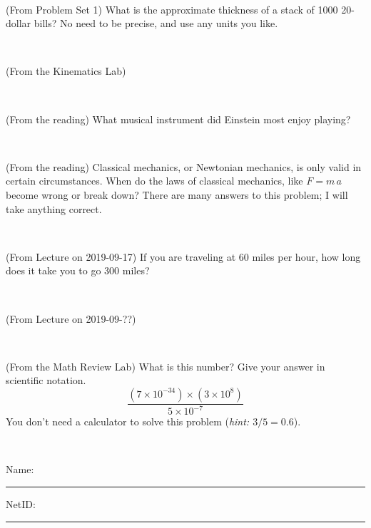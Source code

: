 \documentclass[12pt, letterpaper]{article}
\begin{document}
\vfill ~

\begin{problem} (From Problem Set 1)
What is the approximate thickness of a stack of 1000 20-dollar bills?
No need to be precise, and use any units you like.
\end{problem}


\vfill ~

\begin{problem} (From the Kinematics Lab)

\end{problem}


\vfill ~

\begin{problem} (From the reading)
What musical instrument did Einstein most enjoy playing?
\end{problem}


\vfill ~


\clearpage


\begin{problem} (From the reading)
Classical mechanics, or Newtonian mechanics, is only valid in certain
circumstances. When do the laws of classical mechanics, like $F =
m\,a$ become wrong or break down? There are many answers to this
problem; I will take anything correct.
\end{problem}


\vfill ~

\begin{problem} (From Lecture on 2019-09-17)
If you are traveling at 60 miles per hour, how long does
it take you to go 300 miles?
\end{problem}


\vfill ~

\begin{problem} (From Lecture on 2019-09-??)
\end{problem}


\vfill ~

\begin{problem} (From the Math Review Lab)
What is this number? Give your answer in scientific notation.
$$
\frac{(7\times10^{-34})\times(3\times10^8)}{5\times10^{-7}}
$$
You don't need a calculator to solve this problem (\textit{hint: $3/5=0.6$}).
\end{problem}


\vfill ~


\cleardoublepage



\noindent
Name: \rule[-1ex]{0.60\textwidth}{0.1pt}
NetID: \rule[-1ex]{0.20\textwidth}{0.1pt}
\end{document}
